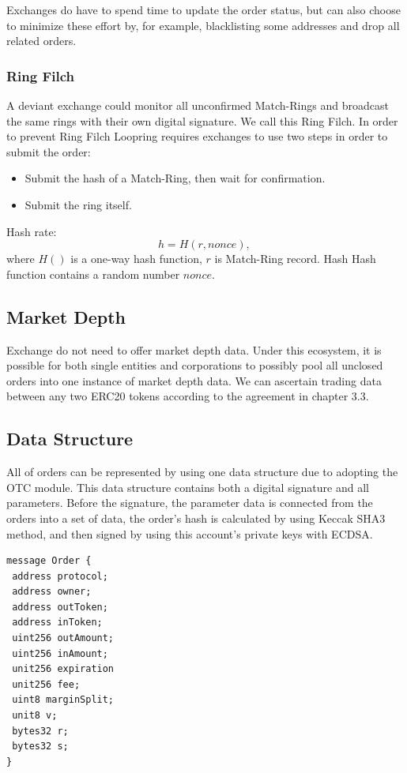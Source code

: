 \documentclass[UTF8,nofonts]{article}
\begin{document}
Exchanges do have to spend time to update the order status, but can also choose to minimize these effort by, for example, blacklisting some addresses and drop all related orders.

\subsubsection{Ring Filch}

A deviant exchange could monitor all unconfirmed Match-Rings and broadcast the same rings with their own digital signature. We call this Ring Filch. In order to prevent Ring Filch Loopring requires exchanges to use two steps in order to submit the order: 
\begin{itemize}
  \item Submit the hash of a Match-Ring, then wait for confirmation.
  \item Submit the ring itself.
\end{itemize}
Hash rate:
$$h = H(r,  nonce)\text{, }$$
where $H()$ is a one-way hash function, $r$ is Match-Ring record. Hash Hash function contains a random number $nonce$.

\subsection{Market Depth\label{sec: marketdepth}}

Exchange do not need to offer market depth data. Under this ecosystem, it is possible for both single entities and corporations to possibly pool all unclosed orders into one instance of market depth data. We can ascertain trading data between any two ERC20 tokens according to the agreement in chapter 3.3.

\subsection{Data Structure\label{sec: dataformat}}

All of orders can be represented by using one data structure due to adopting the OTC module. This data structure contains both a digital signature and all parameters. Before the signature, the parameter data is connected from the orders into a set of data, the order's hash is calculated by using Keccak SHA3 method, and then signed by using this account's private keys with ECDSA.


\begin{verbatim}
message Order {
 address protocol;
 address owner;
 address outToken;
 address inToken;
 uint256 outAmount;
 uint256 inAmount;
 unit256 expiration
 unit256 fee;
 uint8 marginSplit;
 unit8 v;
 bytes32 r;
 bytes32 s;
}
\end{verbatim}
\end{document}
